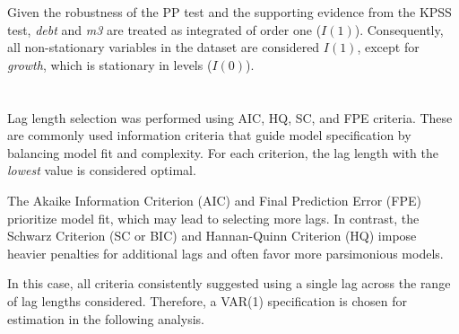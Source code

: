 \documentclass[a4paper,12pt]{article}
\begin{document}


Given the robustness of the PP test and the supporting evidence from the KPSS test, \textit{debt} and \textit{m3} are treated as integrated of order one (\(I(1)\)). Consequently, all non-stationary variables in the dataset are considered \(I(1)\), except for \textit{growth}, which is stationary in levels (\(I(0)\)).

\section{}


Lag length selection was performed using AIC, HQ, SC, and FPE criteria. These are commonly used information criteria that guide model specification by balancing model fit and complexity. For each criterion, the lag length with the \textit{lowest} value is considered optimal. 

The Akaike Information Criterion (AIC) and Final Prediction Error (FPE) prioritize model fit, which may lead to selecting more lags. In contrast, the Schwarz Criterion (SC or BIC) and Hannan-Quinn Criterion (HQ) impose heavier penalties for additional lags and often favor more parsimonious models. 

In this case, all criteria consistently suggested using a single lag across the range of lag lengths considered. Therefore, a VAR(1) specification is chosen for estimation in the following analysis.


\end{document}

